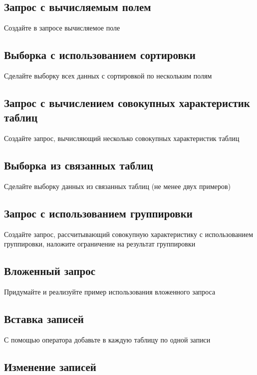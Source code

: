 \subsection{Запрос с вычисляемым полем}

Создайте в запросе вычисляемое поле

\subsection{Выборка с использованием сортировки}

Сделайте выборку всех данных с сортировкой по нескольким полям

\subsection{Запрос с вычислением совокупных характеристик таблиц}

Создайте запрос, вычисляющий несколько совокупных характеристик таблиц

\subsection{Выборка из связанных таблиц}

Сделайте выборку данных из связанных таблиц (не менее двух примеров)

\subsection{Запрос с использованием группировки}

Создайте запрос, рассчитывающий совокупную характеристику с использованием группировки, наложите ограничение на результат группировки

\subsection{Вложенный запрос}

Придумайте и реализуйте пример использования вложенного запроса

\subsection{Вставка записей}

С помощью оператора  добавьте в каждую таблицу по одной записи

\subsection{Изменение записей}

